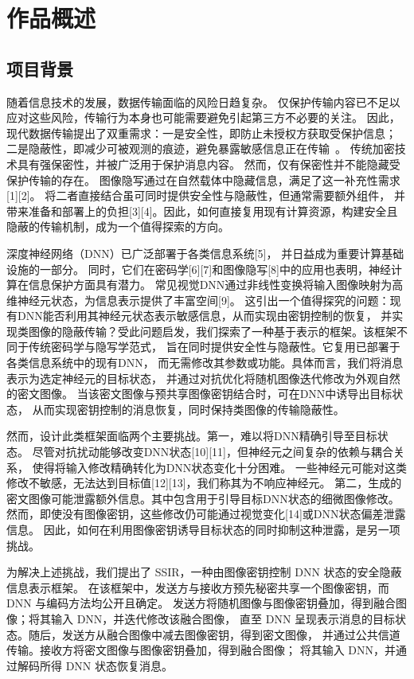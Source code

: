 \chapter{作品概述}
\section{项目背景}
随着信息技术的发展，数据传输面临的风险日趋复杂。
仅保护传输内容已不足以应对这些风险，传输行为本身也可能需要避免引起第三方不必要的关注。
因此，现代数据传输提出了双重需求：一是安全性，即防止未授权方获取受保护信息；
二是隐蔽性，即减少可被观测的痕迹，避免暴露敏感信息正在传输~\cite{1-wang-moulin-2008}。
传统加密技术具有强保密性，并被广泛用于保护消息内容。
然而，仅有保密性并不能隐藏受保护传输的存在。
图像隐写通过在自然载体中隐藏信息，满足了这一补充性需求[1][2]。
将二者直接结合虽可同时提供安全性与隐蔽性，但通常需要额外组件，
并带来准备和部署上的负担[3][4]。因此，如何直接复用现有计算资源，构建安全且隐蔽的传输机制，成为一个值得探索的方向。

深度神经网络（DNN）已广泛部署于各类信息系统[5]，
并日益成为重要计算基础设施的一部分。
同时，它们在密码学[6][7]和图像隐写[8]中的应用也表明，神经计算在信息保护方面具有潜力。
常见视觉DNN通过非线性变换将输入图像映射为高维神经元状态，为信息表示提供了丰富空间[9]。
这引出一个值得探究的问题：现有DNN能否利用其神经元状态表示敏感信息，从而实现由密钥控制的恢复，
并实现类图像的隐蔽传输？受此问题启发，我们探索了一种基于表示的框架。该框架不同于传统密码学与隐写学范式，
旨在同时提供安全性与隐蔽性。它复用已部署于各类信息系统中的现有DNN，
而无需修改其参数或功能。具体而言，我们将消息表示为选定神经元的目标状态，
并通过对抗优化将随机图像迭代修改为外观自然的密文图像。
当该密文图像与预共享图像密钥结合时，可在DNN中诱导出目标状态，
从而实现密钥控制的消息恢复，同时保持类图像的传输隐蔽性。

然而，设计此类框架面临两个主要挑战。第一，难以将DNN精确引导至目标状态。
尽管对抗扰动能够改变DNN状态[10][11]，但神经元之间复杂的依赖与耦合关系，
使得将输入修改精确转化为DNN状态变化十分困难。
一些神经元可能对这类修改不敏感，无法达到目标值[12][13]，我们称其为不响应神经元。
第二，生成的密文图像可能泄露额外信息。其中包含用于引导目标DNN状态的细微图像修改。
然而，即使没有图像密钥，这些修改仍可能通过视觉变化[14]或DNN状态偏差泄露信息。
因此，如何在利用图像密钥诱导目标状态的同时抑制这种泄露，是另一项挑战。

为解决上述挑战，我们提出了 SSIR，一种由图像密钥控制 DNN 状态的安全隐蔽信息表示框架。
在该框架中，发送方与接收方预先秘密共享一个图像密钥，而 DNN 与编码方法均公开且确定。
发送方将随机图像与图像密钥叠加，得到融合图像；将其输入 DNN，并迭代修改该融合图像，
直至 DNN 呈现表示消息的目标状态。随后，发送方从融合图像中减去图像密钥，得到密文图像，
并通过公共信道传输。接收方将密文图像与图像密钥叠加，得到融合图像；
将其输入 DNN，并通过解码所得 DNN 状态恢复消息。

